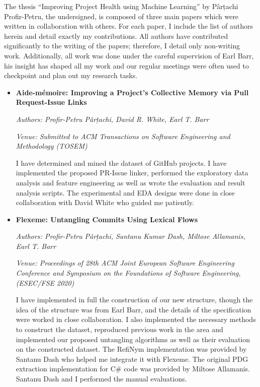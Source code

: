 The thesis “Improving Project Health using Machine Learning” by Pârțachi
Profir-Petru, the undersigned, is composed of three main papers which were
written in collaboration with others. For each paper, I include the list of
authors herein and detail exactly my contributions. All authors have contributed
significantly to the writing of the papers; therefore, I detail only non-writing
work. Additionally, all work was done under the careful supervision of Earl
Barr, his insight has shaped all my work and our regular meetings were often
used to checkpoint and plan out my research tasks.

\begin{itemize}[leftmargin=*]
    \item[] \textbf{Aide-mémoire: Improving a Project’s Collective Memory via
Pull Request-Issue Links} 
    
    \noindent\emph{Authors: Profir-Petru Pârțachi, David R. White, Earl T. Barr}
    
    \noindent\emph{Venue: Submitted to ACM Transactions on Software Engineering
    and Methodology (TOSEM)}

    \noindent I have determined and mined the dataset of GitHub projects. I have
    implemented the proposed PR-Issue linker, performed the exploratory data
    analysis and feature engineering as well as wrote the evaluation and result
    analysis scripts. The experimental and EDA designs were done in close
    collaboration with David White who guided me patiently.

    \item[] \noindent\textbf{Flexeme: Untangling Commits Using Lexical Flows}
    
    \noindent\emph{Authors: Profir-Petru Pârțachi, Santanu Kumar Dash, Miltose
    Allamanis, Earl T. Barr}
    
    \noindent\emph{Venue: Proceedings of 28th ACM Joint European Software
    Engineering Conference and Symposium on the Foundations of Software
    Engineering, (ESEC/FSE 2020)}

    \noindent  I have implemented in full the construction of our new structure,
    though the idea of the structure was from Earl Barr, and the details of the
    specification were worked in close collaboration. I also implemented the
    necessary methods to construct the dataset, reproduced previous work in the
    area and implemented our proposed untangling algorithms as well as their
    evaluation on the constructed dataset. The RefiNym implementation was
    provided by Santanu Dash who helped me integrate it with Flexeme. The
    original PDG extraction implementation for C\# code was provided by Miltose
    Allamanis. Santanu Dash and I performed the manual evaluations.
    

\end{itemize}
